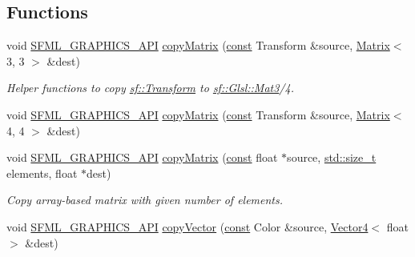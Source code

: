 \subsection*{Functions}
\begin{DoxyCompactItemize}
\item 
void \hyperlink{sfml_2dep_2_s_f_m_l-2_84_82_2include_2_s_f_m_l_2_graphics_2_export_8hpp_ab84c9f1035e146917de3bc0f98d72b35}{S\-F\-M\-L\-\_\-\-G\-R\-A\-P\-H\-I\-C\-S\-\_\-\-A\-P\-I} \hyperlink{_glsl_8inl_aad1baaf4188242e642326ce2230aaa74}{copy\-Matrix} (\hyperlink{term__entry_8h_a57bd63ce7f9a353488880e3de6692d5a}{const} Transform \&source, \hyperlink{struct_matrix}{Matrix}$<$ 3, 3 $>$ \&dest)
\begin{DoxyCompactList}\small\item\em Helper functions to copy \hyperlink{classsf_1_1_transform}{sf\-::\-Transform} to \hyperlink{namespacesf_1_1_glsl_a1bf4595b60b08c79473a882e2c1dbff8}{sf\-::\-Glsl\-::\-Mat3}/4. \end{DoxyCompactList}\item 
void \hyperlink{sfml_2dep_2_s_f_m_l-2_84_82_2include_2_s_f_m_l_2_graphics_2_export_8hpp_ab84c9f1035e146917de3bc0f98d72b35}{S\-F\-M\-L\-\_\-\-G\-R\-A\-P\-H\-I\-C\-S\-\_\-\-A\-P\-I} \hyperlink{_glsl_8inl_a6b1fb08aee1f3eb5f03b9305ac86b315}{copy\-Matrix} (\hyperlink{term__entry_8h_a57bd63ce7f9a353488880e3de6692d5a}{const} Transform \&source, \hyperlink{struct_matrix}{Matrix}$<$ 4, 4 $>$ \&dest)
\item 
void \hyperlink{sfml_2dep_2_s_f_m_l-2_84_82_2include_2_s_f_m_l_2_graphics_2_export_8hpp_ab84c9f1035e146917de3bc0f98d72b35}{S\-F\-M\-L\-\_\-\-G\-R\-A\-P\-H\-I\-C\-S\-\_\-\-A\-P\-I} \hyperlink{_glsl_8inl_ad7522005ab0c281c82e885693abe1ee4}{copy\-Matrix} (\hyperlink{term__entry_8h_a57bd63ce7f9a353488880e3de6692d5a}{const} float $\ast$source, \hyperlink{nc__alloc_8h_a7b60c5629e55e8ec87a4547dd4abced4}{std\-::size\-\_\-t} elements, float $\ast$dest)
\begin{DoxyCompactList}\small\item\em Copy array-\/based matrix with given number of elements. \end{DoxyCompactList}\item 
void \hyperlink{sfml_2dep_2_s_f_m_l-2_84_82_2include_2_s_f_m_l_2_graphics_2_export_8hpp_ab84c9f1035e146917de3bc0f98d72b35}{S\-F\-M\-L\-\_\-\-G\-R\-A\-P\-H\-I\-C\-S\-\_\-\-A\-P\-I} \hyperlink{_glsl_8inl_ab1bc299570e63d80e79c69e572cda030}{copy\-Vector} (\hyperlink{term__entry_8h_a57bd63ce7f9a353488880e3de6692d5a}{const} Color \&source, \hyperlink{struct_vector4}{Vector4}$<$ float $>$ \&dest)

\end{DoxyCompactItemize}
